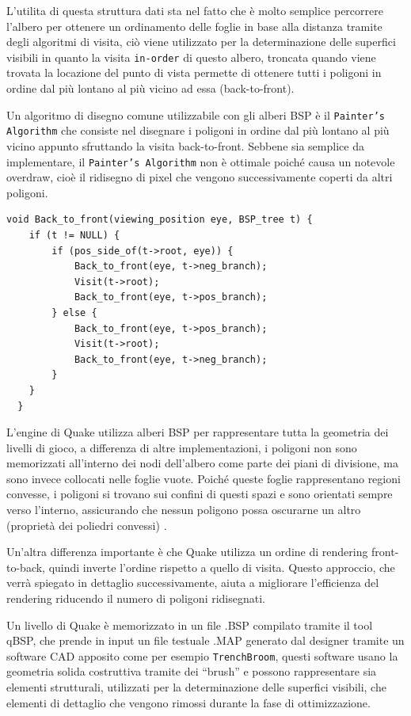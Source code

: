 \documentclass[12pt, letterpaper]{article}
\begin{document}
L'utilita di questa struttura dati sta nel fatto che è molto semplice percorrere l'albero per ottenere un ordinamento delle foglie in base alla distanza tramite degli algoritmi di visita, ciò viene utilizzato per la determinazione delle superfici visibili in quanto la visita \texttt{in-order} di questo albero, troncata quando viene trovata la locazione del punto di vista permette di ottenere tutti i poligoni in ordine dal più lontano al più vicino ad essa (back-to-front).

Un algoritmo di disegno comune utilizzabile con gli alberi BSP è il \texttt{Painter's Algorithm} che consiste nel disegnare i poligoni in ordine dal più lontano al più vicino appunto sfruttando la visita back-to-front. Sebbene sia semplice da implementare, il \texttt{Painter's Algorithm} non è ottimale poiché causa un notevole overdraw, cioè il ridisegno di pixel che vengono successivamente coperti da altri poligoni.\newpage


\begin{lstlisting}[caption=Un algoritmo di visita in-order (Back-To-Front)  \cite{fuchs1980visible}]
void Back_to_front(viewing_position eye, BSP_tree t) {
    if (t != NULL) {
        if (pos_side_of(t->root, eye)) {
            Back_to_front(eye, t->neg_branch);
            Visit(t->root);
            Back_to_front(eye, t->pos_branch);
        } else {
            Back_to_front(eye, t->pos_branch);
            Visit(t->root);
            Back_to_front(eye, t->neg_branch);
        }
    }
  }
\end{lstlisting}

L'engine di Quake utilizza alberi BSP per rappresentare tutta la geometria dei livelli di gioco, a differenza di altre implementazioni, i poligoni non sono memorizzati all'interno dei nodi dell'albero come parte dei piani di divisione, ma sono invece collocati nelle foglie vuote. Poiché queste foglie rappresentano regioni convesse, i poligoni si trovano sui confini di questi spazi e sono orientati sempre verso l'interno, assicurando che nessun poligono possa oscurarne un altro (proprietà dei poliedri convessi) \cite{abrash1997michael}.

Un'altra differenza importante è che Quake utilizza un ordine di rendering front-to-back, quindi inverte l'ordine rispetto a quello di visita. Questo approccio, che verrà spiegato in dettaglio successivamente, aiuta a migliorare l'efficienza del rendering riducendo il numero di poligoni ridisegnati.

Un livello di Quake è memorizzato in un file .BSP compilato tramite il tool qBSP, che prende in input un file testuale .MAP generato dal designer tramite un software CAD apposito come per esempio \texttt{TrenchBroom}, questi software usano la geometria solida costruttiva tramite dei ``brush'' e possono rappresentare sia elementi strutturali, utilizzati per la determinazione delle superfici visibili, che elementi di dettaglio che vengono rimossi durante la fase di ottimizzazione.
\end{document}
